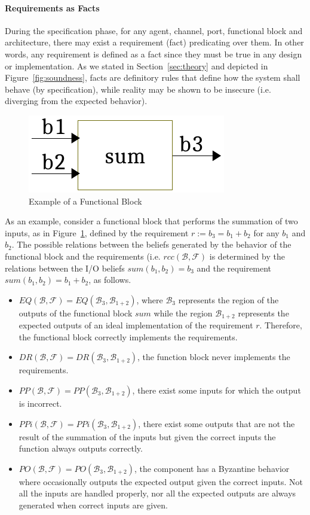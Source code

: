 \documentclass[conference]{IEEEtran}
\newcommand{\beliefRegion}{\mathcal{B}}
\newcommand{\factRegion}{\mathcal{F}}
\newcommand{\Rcc}[2]{rcc(#1,#2)}
\newcommand{\eq}[2]{EQ(#1,#2)}
\newcommand{\pp}[2]{PP(#1,#2)}
\newcommand{\po}[2]{PO(#1,#2)}
\newcommand{\ppi}[2]{PPi(#1,#2)}
\newcommand{\dr}[2]{DR(#1,#2)}
\begin{document}
\paragraph{Requirements as Facts}
During the specification phase, for any agent, channel, port, functional block
and architecture, there may exist a requirement (fact) predicating over them.
In other words, any requirement is defined as a fact since they must be true in
any design or implementation. As we stated in Section~\ref{sec:theory} and depicted in
Figure~\ref{fig:soundness}, facts are definitory rules that define how
the system shall behave (by specification), while reality may be shown to
be insecure (i.e. diverging from the expected behavior).

\begin{figure}[t]
	\centering
	\includegraphics[width=0.3\columnwidth]{sum.pdf}
	\caption{Example of a Functional Block}
	\label{fig:sum}
\end{figure}

As an example, consider a functional block that performs the summation of two
inputs, as in Figure~\ref{fig:sum}, defined by the requirement $r := b_3 = b_1
+ b_2$ for any $b_1$ and $b_2$. The possible relations between the beliefs generated by the behavior of the functional block and
the requirements (i.e. $\Rcc{\beliefRegion}{\factRegion}$ is determined by
the relations between the I/O beliefs $sum(b_1,b_2)=b_3$ and the requirement
$sum(b_1,b_2)=b_1+b_2$, as follows.
\begin{itemize}
	\item $\eq{\beliefRegion}{\factRegion}=\eq{\beliefRegion_3}{\beliefRegion_{1+2}}$, 
		where $\beliefRegion_3$ represents the region of the
		outputs of the functional block $sum$ while the region
		$\beliefRegion_{1+2}$ represents the expected
		outputs of an ideal implementation of the requirement $r$.
		Therefore, the functional block correctly implements the
		requirements.
	\item
		$\dr{\beliefRegion}{\factRegion}=\dr{\beliefRegion_3}{\beliefRegion_{1+2}}$,
		the function block never implements the requirements.
	\item
		$\pp{\beliefRegion}{\factRegion}=\pp{\beliefRegion_3}{\beliefRegion_{1+2}}$, there exist some inputs for which
		the output is incorrect.
	\item $\ppi{\beliefRegion}{\factRegion}=\ppi{\beliefRegion_3}{\beliefRegion_{1+2}}$, there exist some outputs that are not the result of the summation of the inputs but given the correct inputs the function always outputs correctly.
	\item
		$\po{\beliefRegion}{\factRegion}=\po{\beliefRegion_3}{\beliefRegion_{1+2}}$,
		the component has a Byzantine behavior where occasionally
		outputs the expected output given the correct inputs. Not all
		the inputs are handled properly, nor all the expected outputs
		are always generated when correct inputs are given.
\end{itemize}
\end{document}
